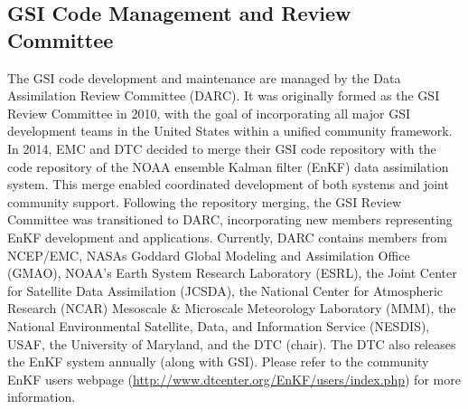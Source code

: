 \subsection{GSI Code Management and Review Committee}
The GSI code development and maintenance are managed by the Data Assimilation Review Committee (DARC). It was originally formed as the GSI Review Committee in 2010, with the  goal of incorporating all major GSI development teams in the United States within a unified community framework. In 2014, EMC and DTC decided to merge their GSI code repository with the code repository of the NOAA ensemble Kalman filter (EnKF) data assimilation system. This merge enabled coordinated development of both systems and joint community support. Following the repository merging, the GSI Review Committee was transitioned to DARC, incorporating new members representing EnKF development and applications. Currently, DARC contains members from NCEP/EMC, NASA\textquotesingle s Goddard Global Modeling and Assimilation Office (GMAO), NOAA's Earth System Research Laboratory (ESRL), the Joint Center for Satellite Data Assimilation (JCSDA), the National Center for Atmospheric Research (NCAR) Mesoscale \& Microscale Meteorology Laboratory (MMM), the National Environmental Satellite, Data, and Information Service (NESDIS), USAF, the University of Maryland, and the DTC (chair). The DTC also releases the EnKF system annually (along with GSI). Please refer to the community EnKF user\textquotesingle s webpage (\url{http://www.dtcenter.org/EnKF/users/index.php}) for more information.

